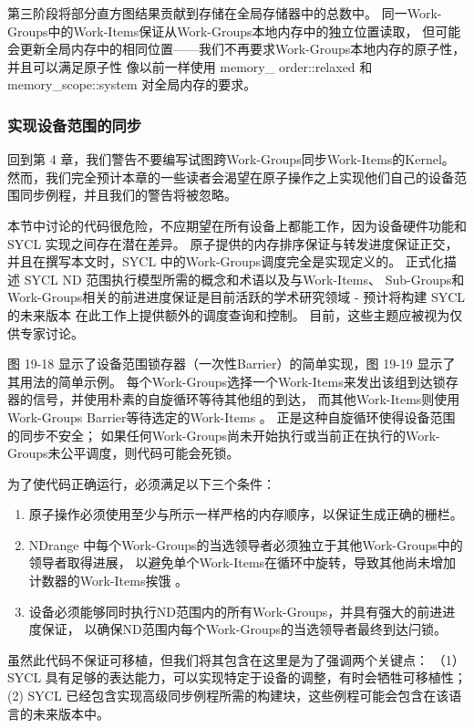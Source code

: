 第三阶段将部分直方图结果贡献到存储在全局存储器中的总数中。 
同一Work-Groups中的Work-Items保证从Work-Groups本地内存中的独立位置读取，
但可能会更新全局内存中的相同位置——我们不再要求Work-Groups本地内存的原子性，
并且可以满足原子性 像以前一样使用 memory\_ order::relaxed 和 memory\_scope::system 对全局内存的要求。

\subsubsection{实现设备范围的同步}
回到第 4 章，我们警告不要编写试图跨Work-Groups同步Work-Items的Kernel。 
然而，我们完全预计本章的一些读者会渴望在原子操作之上实现他们自己的设备范围同步例程，并且我们的警告将被忽略。

本节中讨论的代码很危险，不应期望在所有设备上都能工作，因为设备硬件功能和 SYCL 实现之间存在潜在差异。 
原子提供的内存排序保证与转发进度保证正交，并且在撰写本文时，SYCL 中的Work-Groups调度完全是实现定义的。 
正式化描述 SYCL ND 范围执行模型所需的概念和术语以及与Work-Items、
Sub-Groups和Work-Groups相关的前进进度保证是目前活跃的学术研究领域 - 
预计将构建 SYCL 的未来版本 在此工作上提供额外的调度查询和控制。 目前，这些主题应被视为仅供专家讨论。

图 19-18 显示了设备范围锁存器（一次性Barrier）的简单实现，图 19-19 显示了其用法的简单示例。 
每个Work-Groups选择一个Work-Items来发出该组到达锁存器的信号，并使用朴素的自旋循环等待其他组的到达，
而其他Work-Items则使用Work-Groups Barrier等待选定的Work-Items 。 
正是这种自旋循环使得设备范围的同步不安全； 
如果任何Work-Groups尚未开始执行或当前正在执行的Work-Groups未公平调度，则代码可能会死锁。

为了使代码正确运行，必须满足以下三个条件：

\begin{enumerate}
	\item 原子操作必须使用至少与所示一样严格的内存顺序，以保证生成正确的栅栏。

	\item NDrange 中每个Work-Groups的当选领导者必须独立于其他Work-Groups中的领导者取得进展，
	以避免单个Work-Items在循环中旋转，导致其他尚未增加计数器的Work-Items挨饿 。

	\item 设备必须能够同时执行ND范围内的所有Work-Groups，并具有强大的前进进度保证，
	以确保ND范围内每个Work-Groups的当选领导者最终到达闩锁。
\end{enumerate}

虽然此代码不保证可移植，但我们将其包含在这里是为了强调两个关键点：
（1）SYCL 具有足够的表达能力，可以实现特定于设备的调整，有时会牺牲可移植性； 
(2) SYCL 已经包含实现高级同步例程所需的构建块，这些例程可能会包含在该语言的未来版本中。

